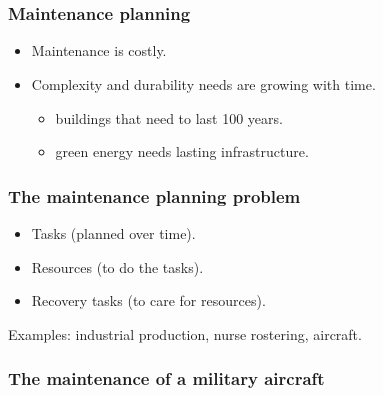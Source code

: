 \section{\introtitle}

\begin{frame}
\frametitle{\textbf{Maintenance planning}}

  \begin{itemize}[<+->]
  \item
    Maintenance is costly.
  \item
    Complexity and durability needs are growing with time.

    \begin{itemize}[<+->]
    
    \item
      buildings that need to last 100 years.
    \item
      green energy needs lasting infrastructure.
    \end{itemize}
  \end{itemize}
\end{frame}

\begin{frame}
\frametitle{\textbf{The maintenance planning problem}}

  \pause

  \begin{itemize}[<+->]

  \item Tasks (planned over time).
  \item Resources (to do the tasks).
  \item Recovery tasks (to care for resources).
  \end{itemize}
  
  \pause
  Examples: industrial production, nurse rostering, aircraft.
\end{frame}

\begin{frame}
\frametitle{\textbf{The maintenance of a military aircraft}}
  \begin{tikzpicture}
    
  \end{tikzpicture}
\end{frame}

